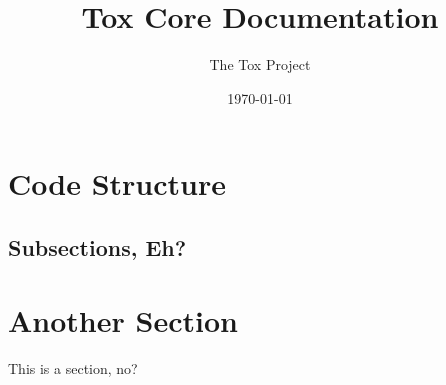 \documentclass[12pt,letterpaper]{report}
\begin{document}
\title{Tox Core Documentation}
\author{The Tox Project}
\date{\today}
\maketitle

\tableofcontents

\newpage
\pagestyle{fancy}

\section{Code Structure}



\subsection{Subsections, Eh?}

\newpage
{}
\section{Another Section}

This is a section, no?
\end{document}
